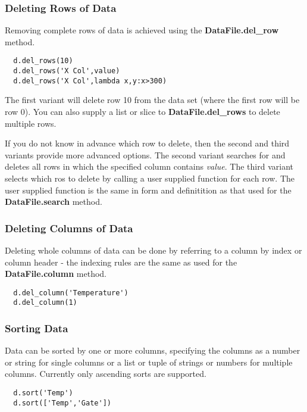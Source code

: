 \documentclass[a4paper,11pt]{scrartcl}
\begin{document}
\subsubsection{Deleting Rows of Data}

Removing complete rows of data is achieved using the \textbf{DataFile.del\_row}
method.

\begin{lstlisting}
  d.del_rows(10)
  d.del_rows('X Col',value)
  d.del_rows('X Col',lambda x,y:x>300)
\end{lstlisting}

The first variant will delete row 10 from the data set (where the first row will
be row 0). You can also supply a list or slice to \textbf{DataFile.del\_rows} to
delete multiple rows.

If you do not know in advance which row to delete, then the second and third
variants provide more advanced options. The second variant searches for and
deletes all rows in which the specified column contains \textit{value}. The
third variant selects which ros to delete by calling a user supplied function
for each row. The user supplied function is the same in form and definitition as
that used for the \textbf{DataFile.search} method.

\subsubsection{Deleting Columns of Data}

Deleting whole columns of data can be done by referring to a column by index or
column header - the indexing rules are the same as used for the
\textbf{DataFile.column} method.

\begin{lstlisting}
  d.del_column('Temperature')
  d.del_column(1)
\end{lstlisting}

\subsubsection{Sorting Data}

Data can be sorted by one or more columns, specifying the columns as a number or
string for single columns or a list or tuple of strings or numbers for multiple
columns. Currently only ascending sorts are supported.

\begin{lstlisting}
  d.sort('Temp')
  d.sort(['Temp','Gate'])
\end{lstlisting}
\end{document}

